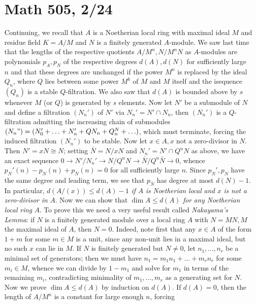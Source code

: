 \documentclass[10pt]{article}
\begin{document}
\section*{Math 505, 2/24}

Continuing, we recall that $A$ is a Noetherian local ring with maximal
ideal $M$ and residue field $K=A/M$ and $N$ is a finitely generated
$A$-module. We saw last time that the lengths of the respective
quotients $A/M^n,N/M^nN$ as $A$-modules are polynomials $p_A,p_N$ of the
respective degrees $d(A),d(N)$ for sufficiently large $n$ and that these
degrees are unchanged if the power $M^n$ is replaced by the ideal $Q_n$,
where $Q$ lies between some power $M^k$ of $M$ and $M$ itself and the
isequence $(Q_n)$ is a stable $Q$-filtration. We also saw that $d(A)$ is
bounded above by $s$ whenever $M$ (or $Q$) is generated by $s$ elements.
Now let $N'$ be a submodule of $N$ and define a filtration $(N_n')$ of
$N'$ via $N_n'=N'\cap N_n$, then $(N_n')$ is a $Q$-filtration admitting
the increasing chain of submodules $(N_n") =
(N_0'+\ldots+N_n'+QN_n+Q^N_n+\ldots)$, which must terminate, forcing the
induced filtration $(N_n')$ to be stable. Now let $x\in A, x$ not a
zero-divisor in $N$. Then $N' = xN\cong N$; setting $\bar{N} = N/xN$ and
$N_n'=N'\cap Q^nN$ as above, we have an exact sequence $0\rightarrow
N'/N_n'\rightarrow N/Q^n N\rightarrow \bar{N}/Q^n \bar{N}\rightarrow 0$,
whence $p_N'(n) - p_N(n) + p_{\bar{N}}(n) = 0$ for all sufficiently
large $n$. Since $p_N',p_N$ have the same degree and leading term, we
see that $p_{\bar{N}}$ has degree at most $d(N) - 1$. In particular,
{\sl $d(A/(x))\le d(A) - 1$ if $A$ is Noetherian local and $x$ is not a
  zero-divisor in $A$}. Now we can show that {\sl $\dim A\le d(A)$ for
  any Noetherian local ring $A$}. To prove this we need a very useful
result called {\sl Nakayama's Lemma}: if $N$ is a finitely generated
module over a local ring $A$ with $N=MN, M$ the maximal ideal of $A$,
then $N = 0$. Indeed, note first that any $x\in A$ of the form $1+m$ for
some $m\in M$ is a unit, since any non-unit lies in a maximal ideal, but
no such $x$ can lie in $M$. If $N$ is finitely generated but $N\ne0$,
let $n_1,\ldots,n_r$ be a minimal set of generators; then we must have
$n_1 = m_1 n_1 + \ldots + m_r n_r$ for some $m_i\in M$, whence we can
divide by $1-m_1$ and solve for $m_1$ in terms of the remaining $m_i$,
contradicting minimality of $m_1,\ldots,m_r$ as a generating set for
$N$. Now we prove $\dim A\le d(A)$ by induction on $d(A)$. If $d(A)=0$,
then the length of $A/M^n$ is a constant for large enough $n$, forcing
\end{document}
